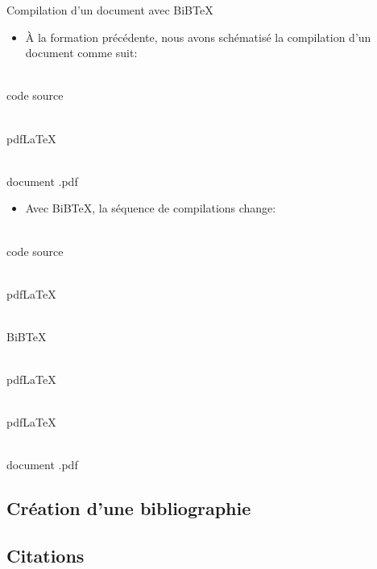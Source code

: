 \begin{frame}[c]{Compilation d'un document avec BiB\TeX}
	\begin{itemize}
		\item À la formation précédente, nous avons schématisé la compilation d'un document comme suit:
	\end{itemize}
	{
		\begin{minipage}[t]{0.25\linewidth}
			\centering
			{\Large\faFileTextO} \\
			code source
		\end{minipage}
		\hfill{\Large\faArrowRight}\hfill
		\begin{minipage}[t]{0.25\linewidth}
			\centering
			{\Large\faCogs} \\
			pdf\LaTeX
		\end{minipage}
		\hfill{\Large\faArrowRight}\hfill
		\begin{minipage}[t]{0.25\linewidth}
			\centering
			{\Large\faFilePdfO} \\
			document .pdf
		\end{minipage}
	}
	
	\pause
	
	\begin{itemize}
		\item Avec BiB\TeX, la séquence de compilations change:		
	\end{itemize}

	{
		\begin{minipage}[t]{0.125\linewidth}
			\centering
			{\Large\faFileTextO} \\
			code source
		\end{minipage}
		\hfill{\Large\faArrowRight}\hfill
		\begin{minipage}[t]{0.125\linewidth}
			\centering
			{\Large\faCogs} \\
			pdf\LaTeX
		\end{minipage}
		\hfill{\Large\faArrowRight}\hfill
		\begin{minipage}[t]{0.125\linewidth}
			\centering
			{\Large\faCogs} \\
			BiB\TeX
		\end{minipage}
		\hfill{\Large\faArrowRight}\hfill
		\begin{minipage}[t]{0.125\linewidth}
			\centering
			{\Large\faCogs} \\
			pdf\LaTeX
		\end{minipage}
		\hfill{\Large\faArrowRight}\hfill
		\begin{minipage}[t]{0.125\linewidth}
			\centering
			{\Large\faCogs} \\
			pdf\LaTeX
		\end{minipage}
		\hfill{\Large\faArrowRight}\hfill
		\begin{minipage}[t]{0.125\linewidth}
			\centering
			{\Large\faFilePdfO} \\
			document .pdf
		\end{minipage}
	}
\end{frame}

\subsection{Création d'une bibliographie}

\subsection{Citations}